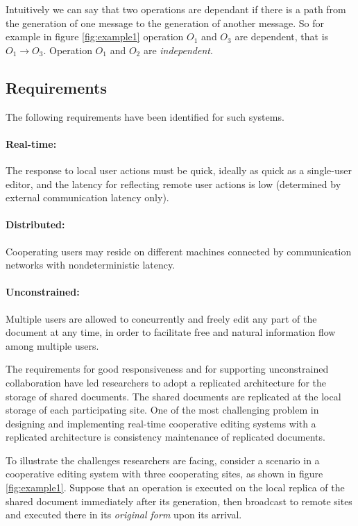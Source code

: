 \documentclass[11pt,a4paper]{article}
\begin{document}
Intuitively we can say that two operations are dependant if there is a path from the generation of one message to the generation of another message. So for example in figure \ref{fig:example1} operation $O_{1}$ and $O_{3}$ are dependent, that is $O_{1}\rightarrow O_{3}$. Operation $O_{1}$ and $O_{2}$ are \emph{independent}. 


\subsection{Requirements}
The following requirements have been identified for such systems.

\paragraph{Real-time:} The response to local user actions must be quick, ideally as quick as a single-user editor, and the latency for reflecting remote user actions is low (determined by external communication latency only). 

\paragraph{Distributed:} Cooperating users may reside on different machines connected by communication networks with nondeterministic latency.

\paragraph{Unconstrained:} Multiple users are allowed to concurrently and freely edit any part of the document at any time, in order to facilitate free and natural information flow among multiple users.

The requirements for good responsiveness and for supporting unconstrained collaboration have led researchers to adopt a replicated architecture for the storage of shared documents. The shared documents are replicated at the local storage of each participating site. One of the most challenging problem in designing and implementing real-time cooperative editing systems with a replicated architecture is consistency maintenance of replicated documents. 

To illustrate the challenges researchers are facing, consider a scenario in a cooperative editing system with three cooperating sites, as shown in figure \ref{fig:example1}. Suppose that an operation is executed on the local replica of the shared document immediately after its generation, then broadcast to remote sites and executed there in its \emph{original form} upon its arrival.
\end{document}
